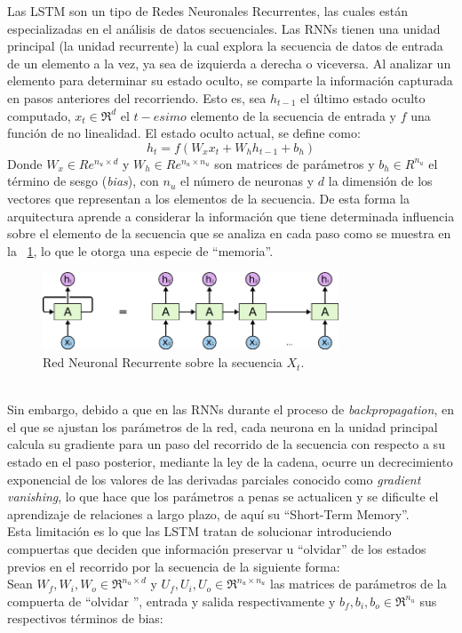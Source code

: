 	Las LSTM son un tipo de Redes Neuronales Recurrentes, las cuales están especializadas en el análisis de datos secuenciales. 
	Las RNNs tienen una unidad principal (la unidad recurrente) la cual explora la secuencia de datos de entrada de un elemento a la vez, ya sea de izquierda a derecha o viceversa. Al analizar un elemento para determinar su estado oculto, se comparte la información capturada en pasos anteriores del recorriendo. Esto es, sea $h_{t-1}$ el último estado oculto computado, $x_t \in \Re^d$ el $t-esimo$ elemento de la secuencia de entrada y $f$ una función de no linealidad. El estado oculto actual, se define como:
	\begin{equation}
		h_t = f(W_xx_t + W_hh_{t-1} + b_h)
		\label{rrn_form}
	\end{equation}
	Donde $W_x \in Re^{n_u\times d}$ y $W_h \in Re^{n_u\times n_u}$ son matrices de parámetros y $b_h \in R^{n_u}$ el término de sesgo (\textit{bias}), con $n_u$ el número de neuronas y $d$ la dimensión de los vectores que representan a los elementos de la secuencia.
	De esta forma la arquitectura aprende a considerar la información que tiene determinada influencia sobre el elemento de la secuencia que se analiza en cada paso como se muestra en la \figurename~\ref{rnn}, lo que le otorga una especie de ``memoria''.
	\begin{figure}[!thb]
		\begin{center}
			\includegraphics[width=250pt]{images/rnn.png}
		\end{center}
		\caption[Red Neuronal Recurrente]{Red Neuronal Recurrente sobre la secuencia $X_t$. \citep{agarwala2017music}}
		\label{rnn}
	\end{figure}
	\\
	Sin embargo, debido a que en las RNNs durante el proceso de \textit{backpropagation}, en el que se ajustan los parámetros de la red, cada neurona en la unidad principal calcula su gradiente para un paso del recorrido de la secuencia con respecto a su estado en el paso posterior, mediante la ley de la cadena, ocurre un decrecimiento exponencial de los valores de las derivadas parciales conocido como \textit{gradient vanishing}, lo que hace que los parámetros a penas se actualicen y se dificulte el aprendizaje de relaciones a largo plazo, de aquí su ``Short-Term Memory''.
	\\
	Esta limitación es lo que las LSTM tratan de solucionar introduciendo compuertas que deciden que información preservar u ``olvidar'' de los estados previos en el recorrido por la secuencia de la siguiente forma:
	\\
	Sean $W_f, W_i, W_o \in \Re^{n_u\times d}$ y $U_f, U_i, U_o \in \Re^{n_u\times n_u}$ las matrices de parámetros de la compuerta de ``olvidar '', entrada y salida respectivamente y $b_f, b_i, b_o \in \Re^{n_u}$ sus respectivos términos de bias:
	
